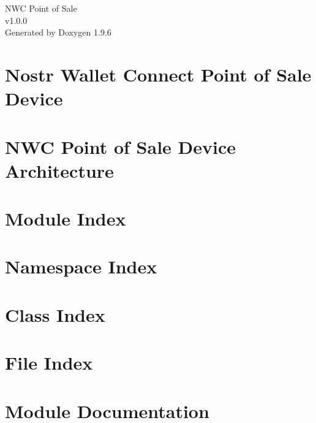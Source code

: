 \documentclass[twoside]{book}
\newcommand{\+}{\discretionary{\mbox{\scriptsize$\hookleftarrow$}}{}{}}
\newcommand{\clearemptydoublepage}{%
    \newpage{\pagestyle{empty}\cleardoublepage}%
  }
\begin{document}
  \raggedbottom
    \hypersetup{pageanchor=false,
                bookmarksnumbered=true,
                pdfencoding=unicode
               }
  \begin{titlepage}
  \vspace*{7cm}
  \begin{center}%
  {\Large NWC Point of Sale}\\
  [1ex]\large v1.\+0.\+0 \\
  \vspace*{1cm}
  {\large Generated by Doxygen 1.9.6}\\
  \end{center}
  \end{titlepage}
  \clearemptydoublepage
  \tableofcontents
  \clearemptydoublepage
  \hypersetup{pageanchor=true}
\chapter{Nostr Wallet Connect Point of Sale Device}
\label{index}\hypertarget{index}{}
\chapter{NWC Point of Sale Device Architecture}
\label{md__a_r_c_h_i_t_e_c_t_u_r_e}

\chapter{Module Index}

\chapter{Namespace Index}

\chapter{Class Index}

\chapter{File Index}

\chapter{Module Documentation}



\end{document}
